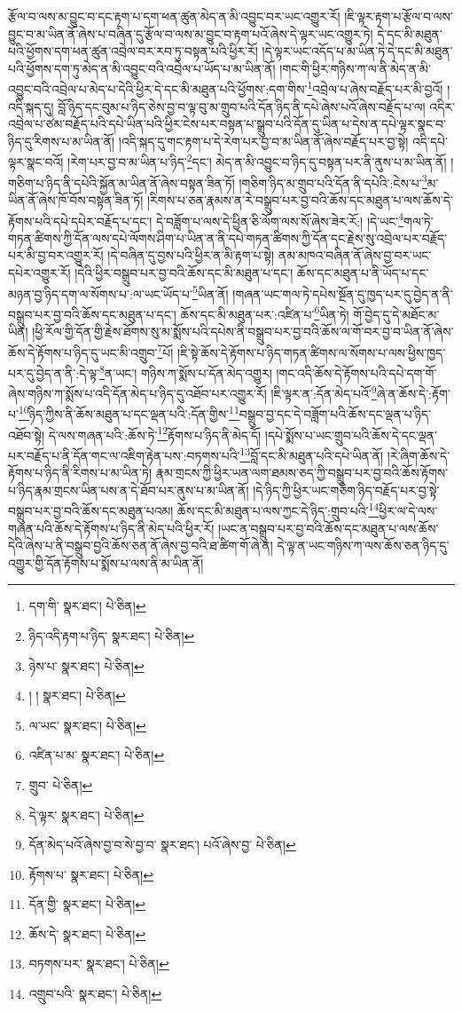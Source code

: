 རྩོལ་བ་ལས་མ་བྱུང་བ་དང་རྟག་པ་དག་ཕན་ཚུན་མེད་ན་མི་འབྱུང་བར་ཡང་འགྱུར་རོ། །ཇི་ལྟར་རྟག་པ་རྩོལ་བ་ལས་བྱུང་བ་མ་ཡིན་ནོ་ཞེས་པ་བཞིན་དུ་རྩོལ་བ་ལས་མ་བྱུང་བ་རྟག་པའོ་ཞེས་དེ་ལྟར་ཡང་འགྱུར་ཏེ། དེ་དང་མི་མཐུན་པའི་ཕྱོགས་དག་ཕན་ཚུན་འབྲེལ་བར་རབ་ཏུ་བསྟན་པའི་ཕྱིར་རོ། །དེ་ལྟར་ཡང་འདོད་པ་མ་ཡིན་ཏེ་དེ་དང་མི་མཐུན་པའི་ཕྱོགས་དག་ཏུ་མེད་ན་མི་འབྱུང་བའི་འབྲེལ་པ་ཡོད་པ་མ་ཡིན་ནོ། །གང་གི་ཕྱིར་གཉིས་ཀ་ལ་ནི་མེད་ན་མི་འབྱུང་བའི་འབྲེལ་པ་མེད་པ་དེའི་ཕྱིར་དེ་དང་མི་མཐུན་པའི་ཕྱོགས་:དག་གིས་\footnote{དག་གི་  སྣར་ཐང་།  པེ་ཅིན། }འབྲེལ་པ་ཞེས་བརྗོད་པར་མི་བྱའོ། །འདི་སྐད་དུ། བློ་ཉིད་དང་བུམ་པ་ཉིད་ཅེས་བྱ་བ་ལྟ་བུ་མ་གྲུབ་པའི་དོན་ཉིད་ནི་དཔེ་ཞེས་པའོ་ཞེས་བརྗོད་པ་ལ། འདིར་འབྲེལ་པ་ཙམ་བརྗོད་པའི་དཔེ་ཡིན་པའི་ཕྱིར་ངེས་པར་བསྟན་པ་སྒྲུབ་པའི་དོན་དུ་ཡིན་པ་དེས་ན་དཔེ་ལྟར་སྣང་བ་ཉིད་དུ་རིགས་པ་མ་ཡིན་ནོ། །འདི་སྐད་དུ་གང་རྟག་པ་དེ་རེག་པར་བྱ་བ་མ་ཡིན་ནོ་ཞེས་བརྗོད་པར་བྱ་སྟེ། འདི་དཔེ་ལྟར་སྣང་བའོ། །རེག་པར་བྱ་བ་མ་ཡིན་པ་ཉིད་\footnote{ཉིད་འདི་རྟག་པ་ཉིད་  སྣར་ཐང་།  པེ་ཅིན། }དང་། མེད་ན་མི་འབྱུང་བ་ཉིད་དུ་བསྟན་པར་ནི་ནུས་པ་མ་ཡིན་ནོ། །གཅིག་པ་ཉིད་ནི་དཔེའི་སྐྱོན་མ་ཡིན་ནོ་ཞེས་བསྟན་ཟིན་ཏོ། །གཅིག་ཉིད་མ་གྲུབ་པའི་དོན་ནི་དཔེའི་:ངེས་པ་\footnote{ཉེས་པ་  སྣར་ཐང་།  པེ་ཅིན། }མ་ཡིན་ནོ་ཞེས་ཁོ་བོས་བསྟན་ཟིན་ཏོ། །རིགས་པ་ཅན་རྣམས་ན་རེ་བསྒྲུབ་པར་བྱ་བའི་ཆོས་དང་མཐུན་པ་ལས་ཆོས་དེ་རྟོགས་པའི་དཔེ་དཔེར་བརྗོད་པ་དང་། དེ་བཟློག་པ་ལས་དེ་ཕྱིན་ཅི་ལོག་ལས་སོ་ཞེས་ཟེར་རོ:། །དེ་ཡང་\footnote{། །  སྣར་ཐང་།  པེ་ཅིན། }གལ་ཏེ་གཏན་ཚིགས་ཀྱི་དོན་ལས་དཔེ་ལོགས་ཤིག་པ་ཡིན་ན་ནི་དཔེ་གཏན་ཚིགས་ཀྱི་དོན་དང་རྗེས་སུ་འབྲེལ་པར་བརྗོད་པར་མི་བྱ་བར་འགྱུར་རོ། །དེ་བཞིན་དུ་བྱས་པའི་ཕྱིར་ན་མི་རྟག་པ་སྟེ། ནམ་མཁའ་བཞིན་ནོ་ཞེས་བྱ་བར་ཡང་དཔེར་འགྱུར་རོ། །དེའི་ཕྱིར་བསྒྲུབ་པར་བྱ་བའི་ཆོས་དང་མི་མཐུན་པ་དང་། ཆོས་དང་མཐུན་པ་ནི་ཡོད་པ་དང་མཉན་བྱ་ཉིད་དག་ལ་སོགས་པ་:ལ་ཡང་ཡོད་པ་\footnote{ལ་ཡང་  སྣར་ཐང་།  པེ་ཅིན། }ཡིན་ནོ། །གཞན་ཡང་གལ་ཏེ་དཔེས་སྔོན་དུ་ཁྱད་པར་དུ་བྱེད་ན་ནི་བསྒྲུབ་པར་བྱ་བའི་ཆོས་དང་མཐུན་པ་དང་། ཆོས་དང་མི་མཐུན་པར་:འཛིན་པ་\footnote{འཛིན་པ་མ་  སྣར་ཐང་།  པེ་ཅིན། }ཡིན་ཏེ། གོ་བྱེད་དུ་དེ་མཐོང་མ་ཡིན། །ཕྱི་རོལ་གྱི་དོན་གྱི་རྗེས་ཐོགས་སུ་མ་སྨོས་པའི་དཔེས་ནི་བསྒྲུབ་པར་བྱ་བའི་ཆོས་ལ་གོ་བར་བྱ་བ་ཡིན་ནོ་ཞེས་ཆོས་དེ་རྟོགས་པ་ཉིད་དུ་ཡང་མི་འགྲུབ་\footnote{གྲུབ་  པེ་ཅིན། }པོ། །ཇི་སྟེ་ཆོས་དེ་རྟོགས་པ་ཉིད་གཏན་ཚིགས་ལ་སོགས་པ་ལས་ཕྱིས་ཁྱད་པར་དུ་བྱེད་ན་ནི་:དེ་ལྟ་\footnote{དེ་ལྟར་  སྣར་ཐང་།  པེ་ཅིན། }ན་ཡང་། གཉིས་ཀ་སྨོས་པ་དོན་མེད་འགྱུར། །གང་འདི་ཆོས་དེ་རྟོགས་པའི་དཔེ་དག་གོ་ཞེས་གཉིས་ཀ་སྨོས་པ་འདི་དོན་མེད་པ་ཉིད་དུ་འཐོབ་པར་འགྱུར་རོ། །ཇི་ལྟར་ན་:དོན་མེད་པའོ་\footnote{དོན་མེད་པའོ་ཞེས་བྱ་བ་ེས་བྱ་བ་  སྣར་ཐང་། པའོ་ཞེས་བྱ་  པེ་ཅིན། }ཞེ་ན་ཆོས་དེ་:རྟོག་པ་\footnote{རྟོགས་པ་  སྣར་ཐང་།  པེ་ཅིན། }ཉིད་ཀྱིས་ནི་ཆོས་མཐུན་པ་དང་ལྡན་པའི་:དོན་གྱིས་\footnote{དོན་གྱི་  སྣར་ཐང་།  པེ་ཅིན། }བསྒྲུབ་བྱ་དང་དེ་བཟློག་པའི་ཆོས་དང་ལྡན་པ་ཉིད་འཐོབ་སྟེ། དེ་ལས་གཞན་པའི་:ཆོས་ཏེ་\footnote{ཆོས་དེ་  སྣར་ཐང་།  པེ་ཅིན། }རྟོགས་པ་ཉིད་ནི་མེད་དོ། །དཔེ་སྨོས་པ་ཡང་གྲུབ་པའི་ཆོས་དེ་དང་ལྡན་པར་བརྗོད་པ་ནི་དོན་གང་ལ་འཇིག་རྟེན་པས་:བཏགས་པའི་\footnote{བཏགས་པར་  སྣར་ཐང་།  པེ་ཅིན། }བློ་དང་མི་མཐུན་པའི་དཔེ་ཡིན་ནོ། །རེ་ཞིག་ཆོས་དེ་རྟོགས་པ་ཉིད་ནི་རིགས་པ་མ་ཡིན་ཏེ། རྣམ་གྲངས་ཀྱི་ཕྱིར་ཡན་ལག་ཐམས་ཅད་ཀྱི་བསྒྲུབ་པར་བྱ་བའི་ཆོས་རྟོགས་པ་ཉིད་རྣམ་གྲངས་ཡིན་པས་ན་དེ་ཐོབ་པར་ནུས་པ་མ་ཡིན་ནོ། །དེ་ཉིད་ཀྱི་ཕྱིར་ཡང་གཅིག་ཉིད་བརྗོད་པར་བྱ་སྟེ་བསྒྲུབ་པར་བྱ་བའི་ཆོས་དང་མཐུན་པའམ། ཆོས་དང་མི་མཐུན་པ་ལས་ཀྱང་དེ་ཉིད་:གྲུབ་པའི་\footnote{འགྲུབ་པའི་  སྣར་ཐང་།  པེ་ཅིན། }ཕྱིར་ལ་དེ་ལས་གཞན་པའི་ཆོས་དེ་རྟོགས་པ་ཉིད་ནི་མེད་པའི་ཕྱིར་རོ། །ཡང་ན་བསྒྲུབ་པར་བྱ་བའི་ཆོས་དང་མཐུན་པ་ལས་ཆོས་དེའི་ཞེས་པ་ནི་བསྒྲུབ་བྱའི་ཆོས་ཅན་ནོ་ཞེས་བྱ་བའི་ཐ་ཚིག་གོ་ཞེ་ན། དེ་ལྟ་ན་ཡང་གཉིས་ཀ་ལས་ཆོས་ཅན་ཉིད་དུ་འགྱུར་གྱི་དོན་རྟོགས་པ་སྨོས་པ་ལས་ནི་མ་ཡིན་ནོ། 